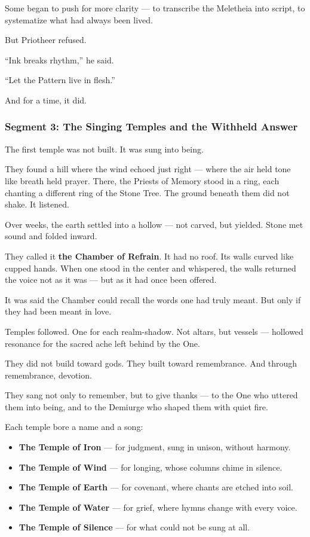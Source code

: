 \documentclass[9pt]{article}
\begin{document}
Some began to push for more clarity —  
to transcribe the Meletheia into script,  
to systematize what had always been lived.

But Priotheer refused.

“Ink breaks rhythm,” he said.

“Let the Pattern live in flesh.”

And for a time, it did.

\newpage

\subsubsection*{Segment 3: The Singing Temples and the Withheld Answer}

The first temple was not built.  
It was sung into being.

They found a hill where the wind echoed just right —  
where the air held tone like breath held prayer.  
There, the Priests of Memory stood in a ring, each chanting a different ring of the Stone Tree.  
The ground beneath them did not shake.  
It listened.

Over weeks, the earth settled into a hollow — not carved, but yielded.  
Stone met sound and folded inward.

They called it \textbf{the Chamber of Refrain}.  
It had no roof.  
Its walls curved like cupped hands.  
When one stood in the center and whispered,  
the walls returned the voice not as it was —  
but as it had once been offered.

It was said the Chamber could recall the words one had truly meant.  
But only if they had been meant in love.

Temples followed.  
One for each realm-shadow.  
Not altars, but vessels —  
hollowed resonance for the sacred ache left behind by the One.

They did not build toward gods.  
They built toward remembrance.  
And through remembrance, devotion.

They sang not only to remember,  
but to give thanks —  
to the One who uttered them into being,  
and to the Demiurge who shaped them with quiet fire.

Each temple bore a name and a song:

\begin{itemize}
\item \textbf{The Temple of Iron} — for judgment, sung in unison, without harmony.
\item \textbf{The Temple of Wind} — for longing, whose columns chime in silence.
\item \textbf{The Temple of Earth} — for covenant, where chants are etched into soil.
\item \textbf{The Temple of Water} — for grief, where hymns change with every voice.
\item \textbf{The Temple of Silence} — for what could not be sung at all.
\end{itemize}
\end{document}
